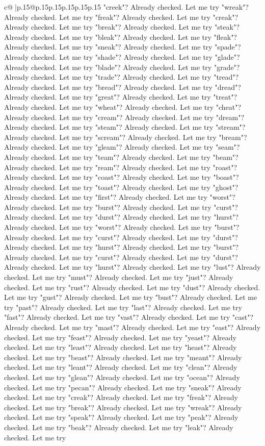 \documentclass{article}
\begin{document}
{\begin{supertabular}{c@{$\;$}|p{.15\linewidth}@{}p{.15\linewidth}p{.15\linewidth}p{.15\linewidth}p{.15\linewidth}p{.15\linewidth}}
{{{"creek"? Already checked. Let me try "wreak"? Already checked. Let me try "freak"? Already checked. Let me try "creak"? Already checked. Let me try "break"? Already checked. Let me try "steak"? Already checked. Let me try "bleak"? Already checked. Let me try "fleak"? Already checked. Let me try "sneak"? Already checked. Let me try "spade"? Already checked. Let me try "shade"? Already checked. Let me try "glade"? Already checked. Let me try "blade"? Already checked. Let me try "grade"? Already checked. Let me try "trade"? Already checked. Let me try "tread"? Already checked. Let me try "bread"? Already checked. Let me try "dread"? Already checked. Let me try "great"? Already checked. Let me try "treat"? Already checked. Let me try "wheat"? Already checked. Let me try "cheat"? Already checked. Let me try "cream"? Already checked. Let me try "dream"? Already checked. Let me try "steam"? Already checked. Let me try "stream"? Already checked. Let me try "scream"? Already checked. Let me try "bream"? Already checked. Let me try "gleam"? Already checked. Let me try "seam"? Already checked. Let me try "team"? Already checked. Let me try "beam"? Already checked. Let me try "ream"? Already checked. Let me try "roast"? Already checked. Let me try "coast"? Already checked. Let me try "boast"? Already checked. Let me try "toast"? Already checked. Let me try "ghost"? Already checked. Let me try "first"? Already checked. Let me try "worst"? Already checked. Let me try "burst"? Already checked. Let me try "curst"? Already checked. Let me try "durst"? Already checked. Let me try "hurst"? Already checked. Let me try "worst"? Already checked. Let me try "burst"? Already checked. Let me try "curst"? Already checked. Let me try "durst"? Already checked. Let me try "hurst"? Already checked. Let me try "burst"? Already checked. Let me try "curst"? Already checked. Let me try "durst"? Already checked. Let me try "hurst"? Already checked. Let me try "lust"? Already checked. Let me try "must"? Already checked. Let me try "just"? Already checked. Let me try "rust"? Already checked. Let me try "dust"? Already checked. Let me try "gust"? Already checked. Let me try "bust"? Already checked. Let me try "past"? Already checked. Let me try "last"? Already checked. Let me try "fast"? Already checked. Let me try "vast"? Already checked. Let me try "cast"? Already checked. Let me try "mast"? Already checked. Let me try "east"? Already checked. Let me try "feast"? Already checked. Let me try "yeast"? Already checked. Let me try "least"? Already checked. Let me try "heast"? Already checked. Let me try "beast"? Already checked. Let me try "meant"? Already checked. Let me try "leant"? Already checked. Let me try "clean"? Already checked. Let me try "glean"? Already checked. Let me try "ocean"? Already checked. Let me try "pecan"? Already checked. Let me try "sneak"? Already checked. Let me try "creak"? Already checked. Let me try "freak"? Already checked. Let me try "break"? Already checked. Let me try "wreak"? Already checked. Let me try "speak"? Already checked. Let me try "peak"? Already checked. Let me try "beak"? Already checked. Let me try "leak"? Already checked. Let me try }}}
\end{supertabular}}
\end{document}
